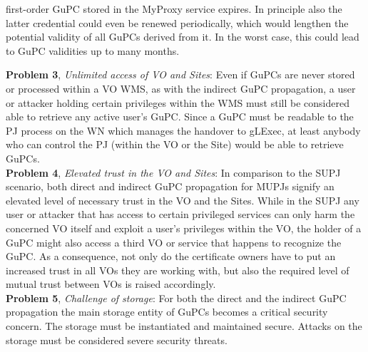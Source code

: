\documentclass[10pt]{iopart}
\begin{document}
first-order GuPC stored in the MyProxy service expires. In principle also the
latter credential could even be renewed periodically, which
would lengthen the potential validity of all GuPCs derived from it. In the
worst case, this could lead to GuPC validities up to many months.\\
\par
\begingroup
\leftskip=0.4cm
\noindent
\textbf{Problem 3}, \textit{Unlimited access of VO and Sites}: Even if GuPCs
are never stored or processed within a VO WMS, as with
the indirect GuPC propagation, a user or attacker holding certain privileges
within the
WMS must still be considered able to retrieve any active
user's GuPC. Since a GuPC must be readable to the
PJ process on the WN which manages the handover to gLExec, at least anybody
who can control the PJ (within the VO or the Site) would be able to retrieve GuPCs.\\

\noindent
\textbf{Problem 4}, \textit{Elevated trust in the VO and Sites}: In
comparison to the SUPJ scenario, both direct and indirect GuPC propagation for MUPJs
signify an elevated level of necessary trust in the VO
and the Sites. While in the SUPJ any user
or attacker that has access to certain privileged services can only harm the concerned VO itself
and exploit a user's
privileges within the VO, the holder of a GuPC might also access a
third VO or service that happens to recognize the GuPC. As a consequence,
not only do the certificate owners have to put an increased trust in all VOs
they are working with, but also the required level of mutual trust between VOs
is raised accordingly.\\

\noindent
\textbf{Problem 5}, \textit{Challenge of storage}:
For both the direct and the indirect GuPC propagation the main storage
entity of GuPCs becomes a critical security concern. The storage must be
instantiated and maintained secure. Attacks on the storage must
be considered severe security threats.\\
\end{document}
